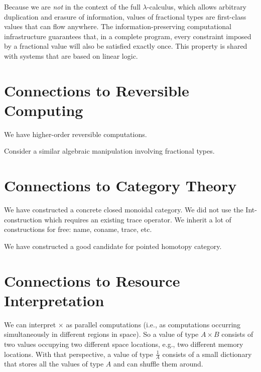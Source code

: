 \documentclass[11pt]{article}
\begin{document}
Because we are \emph{not} in the context of the full $\lambda$-calculus,
which allows arbitrary duplication and erasure of information, values of
fractional types are first-class values that can flow anywhere. The
information-preserving computational infrastructure guarantees that, in a
complete program, every constraint imposed by a fractional value will also be
satisfied exactly once. This property is shared with systems that are based
on linear logic.

\section{Connections to Reversible Computing}

We have higher-order reversible computations.

Consider a similar algebraic manipulation involving fractional types.
\begin{center}
\end{center}

\section{Connections to Category Theory} 

We have constructed a concrete closed monoidal category. We did not use the
Int-construction which requires an existing trace operator. We inherit a lot
of constructions for free: name, coname, trace, etc.

We have constructed a good candidate for pointed homotopy category.

\section{Connections to Resource Interpretation} 

We can interpret $\times$ as parallel computations (i.e., as computations
occurring simultaneously in different regions in space). So a value of type
$A \times B$ consists of two values occupying two different space locations,
e.g., two different memory locations. With that perspective, a value of type
$\frac{1}{A}$ consists of a small dictionary that stores all the values of
type $A$ and can shuffle them around.
\end{document}
